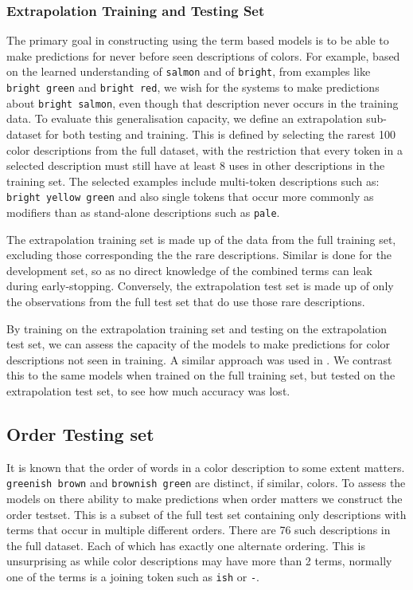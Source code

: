 \documentclass[11pt,a4paper]{article}
\newcommand{\textcite}{\citet}
\newcommand{\natlang}[1]{\texttt{#1}}
\begin{document}
\subsubsection{Extrapolation Training and Testing Set}
The primary goal in constructing using the term based models is to be able to make predictions for never before seen descriptions of colors.
For example, based on the learned understanding of \texttt{salmon} and of \texttt{bright}, from examples like \texttt{bright green} and \texttt{bright red}, we wish for the systems to make predictions about \texttt{bright salmon}, even though that description never occurs in the training data.
%
To evaluate this generalisation capacity, we define an extrapolation sub-dataset for both testing and training.
This is defined by selecting the rarest 100 color descriptions from the full dataset,
with the restriction that every token in a selected description must still have at least 8 uses in other descriptions in the training set.
The selected examples include multi-token descriptions such as: \texttt{bright yellow green} and also single tokens that occur more commonly as modifiers than as stand-alone descriptions such as \texttt{pale}.

The extrapolation training set is made up of the data from the full training set, excluding those  corresponding the the rare descriptions.
Similar is done for the development set, so as no direct knowledge of the combined terms can leak during early-stopping.
Conversely, the extrapolation test set is made up of only the observations from the full test set that do use those rare descriptions.


By training on the extrapolation training set and testing on the extrapolation test set, we can assess the capacity of the models to make predictions for color descriptions not seen in training.
A similar approach was used in \textcite{DBLP:journals/corr/AtzmonBKGC16}.
We contrast this to the same models when trained on the full training set, but tested on the extrapolation test set, to see how much accuracy was lost.


\subsection{Order Testing set}
It is known that the order of words in a color description to some extent matters.
\natlang{greenish brown} and \natlang{brownish green} are distinct, if similar, colors.
To assess the models on there ability to make predictions when order matters we construct the order testset.
This is a subset of the full test set containing only descriptions with terms that occur in multiple different orders.
There are 76 such descriptions in the full dataset.
Each of which has exactly one alternate ordering.
This is unsurprising as while color descriptions may have more than 2 terms, normally one of the terms is a joining token such as \natlang{ish} or \natlang{-}.
\end{document}
